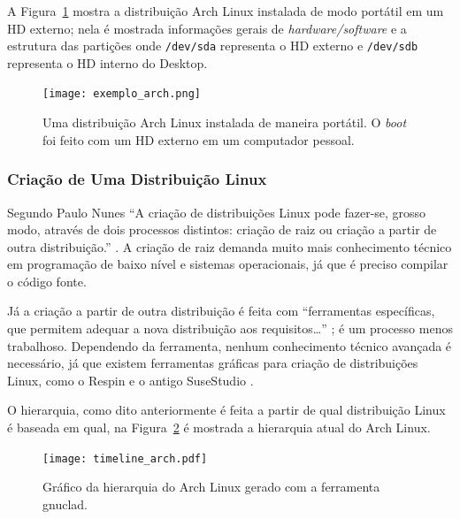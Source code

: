 \documentclass[
article,			%
12pt,				%
openright,			%
oneside,			%
a4paper,			%
chapter=TITLE,		%
section=TITLE,		%
subsection=TITLE,	%
subsubsection=TITLE,%
subsubsubsection=TITLE, %
english,			%
brazil,				%
]{abntex2}
\def\code#1{\texttt{#1}}
\begin{document}
A Figura~\ref{fig:exemplo-distro} mostra a distribuição Arch Linux
instalada de modo portátil em um HD externo; nela é mostrada
informações gerais de \emph{hardware/software} e a estrutura
das partições onde \code{/dev/sda} representa o HD externo e
\code{/dev/sdb} representa o HD interno do Desktop.

\begin{figure}[!htbp]
    \caption{\label{fig:exemplo-distro}Uma distribuição Arch Linux
        instalada de maneira portátil. O \emph{boot} foi feito com um HD
    externo em um computador pessoal.}
    \begin{center}
        \texttt{[image: exemplo\_arch.png]}
    \end{center}
\end{figure}

\subsubsection{Criação de Uma Distribuição Linux}

Segundo Paulo Nunes ``A criação  de  distribuições  Linux pode
fazer-se, grosso modo,  através  de  dois processos distintos: criação
de raiz ou criação a partir de outra distribuição.'' \cite[p.
78]{Nunes2009}. A criação de raiz demanda muito mais conhecimento
técnico em programação de baixo nível e sistemas operacionais, já que
é preciso compilar o código fonte.

Já a criação a partir de outra distribuição é feita com ``ferramentas
específicas, que  permitem adequar  a  nova  distribuição  aos
requisitos\ldots'' \cite[p.  78]{Nunes2009}; é um processo menos
trabalhoso. Dependendo da ferramenta, nenhum conhecimento técnico
avançada é necessário, já que existem ferramentas gráficas para
criação de distribuições Linux, como o Respin e o antigo SuseStudio
\cite{Respin2018}.

O hierarquia, como dito anteriormente é feita a partir de qual
distribuição Linux é baseada em qual, na
Figura~\ref{fig:hierarquia-arch} é mostrada a hierarquia atual do Arch
Linux.

\begin{figure}[!htbp]
    \caption{\label{fig:hierarquia-arch}Gráfico da hierarquia do Arch
    Linux gerado com a ferramenta gnuclad.}
    \begin{center}
        \texttt{[image: timeline\_arch.pdf]}
    \end{center}
\end{figure}

\pagebreak 
\end{document}
